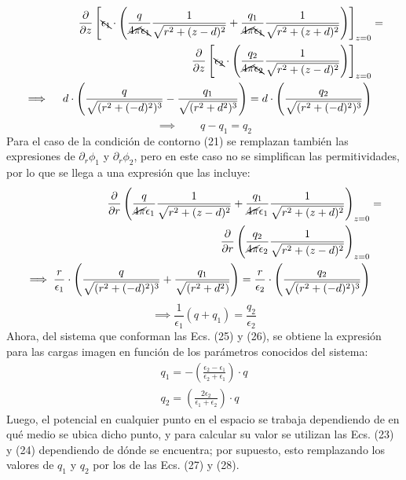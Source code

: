 \documentclass[12pt, notitlepage]{article}
\numberwithin{equation}{section}
\begin{document}
\begin{align*}
\frac{\partial}{\partial z}\left[\bcancel{\epsilon_1}\cdot\left(\frac{q}{\cancel{4\pi}\bcancel{\epsilon_1}}\frac{1}{\sqrt{r^2+(z-d)^2}}+\frac{q_1}{\cancel{4\pi}\bcancel{\epsilon_1}}\frac{1}{\sqrt{r^2 + (z+d)^2}}\right)\right]_{z = 0} &=\\ \frac{\partial}{\partial z}\left[\bcancel{\epsilon_2}\cdot\left(\frac{q_2}{\cancel{4\pi}\bcancel{\epsilon_2}}\frac{1}{\sqrt{r^2 + (z-d)^2}}\right)\right]_{z=0}&\\
\implies\quad d\cdot\left(\frac{q}{\sqrt{(r^2 + (-d)^2)^3}} - \frac{q_1}{\sqrt{(r^2 + d^2)^3}}\right) = d\cdot\left(\frac{q_2}{\sqrt{(r^2 + (-d)^2)^3}}\right)
\end{align*}
\begin{equation}
\implies \qquad q - q_1 = q_2
\end{equation}
Para el caso de la condición de contorno (21) se remplazan también las expresiones de $\partial_r\phi_1$ y $\partial_r\phi_2$, pero en este caso no se simplifican las permitividades, por lo que se llega a una expresión que las incluye:
\begin{align*}
\frac{\partial}{\partial r}\left(\frac{q}{\cancel{4\pi}\epsilon_1}\frac{1}{\sqrt{r^2 + (z-d)^2}} + \frac{q_1}{\cancel{4\pi}\epsilon_1}\frac{1}{\sqrt{r^2 + (z+d)^2}}\right)_{z=0}& =\\
\frac{\partial}{\partial r}\left(\frac{q_2}{\cancel{4\pi}\epsilon_2}\frac{1}{\sqrt{r^2 + (z-d)^2}}\right)_{z=0}&\\
\implies \frac{r}{\epsilon_1}\cdot\left(\frac{q}{\sqrt{(r^2 + (-d)^2)^3}}+ \frac{q_1}{\sqrt{(r^2 + d^2)}}\right) = \frac{r}{\epsilon_2}\cdot\left(\frac{q_2}{\sqrt{(r^2 + (-d)^2)^3}}\right)&
\end{align*}
\begin{equation}
\implies \frac{1}{\epsilon_1}(q + q_1) = \frac{q_2}{\epsilon_2}
\end{equation}
Ahora, del sistema que conforman las Ecs. (25) y (26), se obtiene la expresión para las cargas imagen en función de los parámetros conocidos del sistema:
\begin{gather}
q_1 = -\left(\frac{\epsilon_2 - \epsilon_1}{\epsilon_2 + \epsilon_1}\right)\cdot q\\
q_2 = \left(\frac{2\epsilon_2}{\epsilon_1 + \epsilon_2}\right)\cdot q
\end{gather}
Luego, el potencial en cualquier punto en el espacio se trabaja dependiendo de en qué medio se ubica dicho punto, y para calcular su valor se utilizan las Ecs. (23) y (24) dependiendo de dónde se encuentra; por supuesto, esto remplazando los valores de $q_1$ y $q_2$ por los de las Ecs. (27) y (28).
\end{document}

